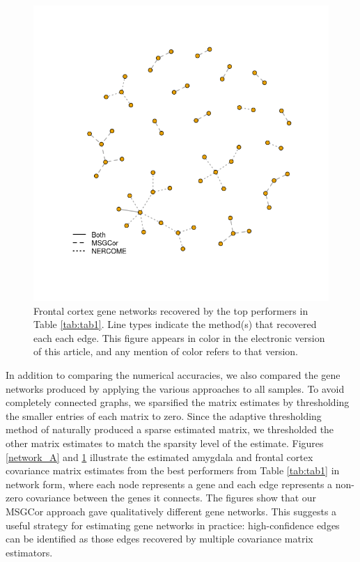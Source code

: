 \documentclass[useAMS,referee,usenatbib]{biom}
\begin{document}
\begin{figure}
  \begin{center}
    \includegraphics[width=0.45\textheight]{img/networks_FC_2.png}
  \end{center}
\caption{Frontal cortex gene networks recovered by the top performers in Table \ref{tab:tab1}. Line types indicate the method(s) that recovered each each edge. This figure appears in color in the electronic version of this article, and any mention of color refers to that version.}
\label{network_FC}
\end{figure}

In addition to comparing the numerical accuracies, we also compared the gene networks produced by applying the various approaches to all samples. To avoid completely connected graphs, we sparsified the matrix estimates by thresholding the smaller entries of each matrix to zero. Since the adaptive thresholding method of \citet{cai2011adaptive} naturally produced a sparse estimated matrix, we thresholded the other matrix estimates to match the sparsity level of the \citet{cai2011adaptive} estimate. Figures \ref{network_A} and \ref{network_FC} illustrate the estimated amygdala and frontal cortex covariance matrix estimates from the best performers from Table \ref{tab:tab1} in network form, where each node represents a gene and each edge represents a non-zero covariance between the genes it connects. The figures show that our MSGCor approach gave qualitatively different gene networks. This suggests a useful strategy for estimating gene networks in practice: high-confidence edges can be identified as those edges recovered by multiple covariance matrix estimators.
\end{document}

